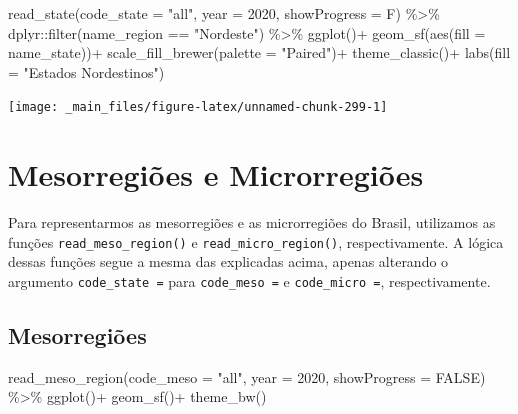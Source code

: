 \documentclass[
  brazilian,
]{book}
\newenvironment{Shaded}{\begin{snugshade}}{\end{snugshade}}
\newcommand{\AttributeTok}[1]{\textcolor[rgb]{0.77,0.63,0.00}{#1}}
\newcommand{\ConstantTok}[1]{\textcolor[rgb]{0.00,0.00,0.00}{#1}}
\newcommand{\DecValTok}[1]{\textcolor[rgb]{0.00,0.00,0.81}{#1}}
\newcommand{\FunctionTok}[1]{\textcolor[rgb]{0.00,0.00,0.00}{#1}}
\newcommand{\NormalTok}[1]{#1}
\newcommand{\SpecialCharTok}[1]{\textcolor[rgb]{0.00,0.00,0.00}{#1}}
\newcommand{\StringTok}[1]{\textcolor[rgb]{0.31,0.60,0.02}{#1}}
\begin{document}
\begin{Shaded}
\begin{Highlighting}[]
\FunctionTok{read\_state}\NormalTok{(}\AttributeTok{code\_state =} \StringTok{"all"}\NormalTok{,}
           \AttributeTok{year =} \DecValTok{2020}\NormalTok{,}
           \AttributeTok{showProgress =}\NormalTok{ F) }\SpecialCharTok{\%\textgreater{}\%} 
\NormalTok{  dplyr}\SpecialCharTok{::}\FunctionTok{filter}\NormalTok{(name\_region }\SpecialCharTok{==} \StringTok{"Nordeste"}\NormalTok{) }\SpecialCharTok{\%\textgreater{}\%}
  \FunctionTok{ggplot}\NormalTok{()}\SpecialCharTok{+}
  \FunctionTok{geom\_sf}\NormalTok{(}\FunctionTok{aes}\NormalTok{(}\AttributeTok{fill =}\NormalTok{ name\_state))}\SpecialCharTok{+}
  \FunctionTok{scale\_fill\_brewer}\NormalTok{(}\AttributeTok{palette =} \StringTok{"Paired"}\NormalTok{)}\SpecialCharTok{+}
  \FunctionTok{theme\_classic}\NormalTok{()}\SpecialCharTok{+}
  \FunctionTok{labs}\NormalTok{(}\AttributeTok{fill =} \StringTok{"Estados Nordestinos"}\NormalTok{)}
\end{Highlighting}
\end{Shaded}

\begin{center}\texttt{[image: \_main\_files/figure-latex/unnamed-chunk-299-1]} \end{center}

\hypertarget{mesorregiuxf5es-e-microrregiuxf5es}{%
\section{Mesorregiões e Microrregiões}\label{mesorregiuxf5es-e-microrregiuxf5es}}

Para representarmos as mesorregiões e as microrregiões do Brasil, utilizamos as funções \texttt{read\_meso\_region()} e \texttt{read\_micro\_region()}, respectivamente. A lógica dessas funções segue a mesma das explicadas acima, apenas alterando o argumento \texttt{code\_state\ =} para \texttt{code\_meso\ =} e \texttt{code\_micro\ =}, respectivamente.

\hypertarget{mesorregiuxf5es}{%
\subsection{Mesorregiões}\label{mesorregiuxf5es}}

\begin{Shaded}
\begin{Highlighting}[]
\FunctionTok{read\_meso\_region}\NormalTok{(}\AttributeTok{code\_meso =} \StringTok{"all"}\NormalTok{,}
                 \AttributeTok{year =} \DecValTok{2020}\NormalTok{,}
                 \AttributeTok{showProgress =} \ConstantTok{FALSE}\NormalTok{) }\SpecialCharTok{\%\textgreater{}\%}
  \FunctionTok{ggplot}\NormalTok{()}\SpecialCharTok{+}
  \FunctionTok{geom\_sf}\NormalTok{()}\SpecialCharTok{+}
  \FunctionTok{theme\_bw}\NormalTok{()}
\end{Highlighting}
\end{Shaded}
\end{document}
